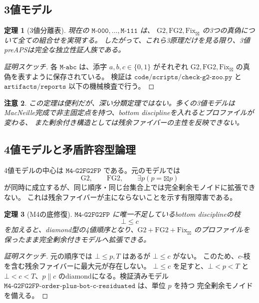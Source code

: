 \documentclass[uplatex,dvipdfmx,a4paper,10pt]{jsarticle}
\newtheorem{theorem}{定理}
\newtheorem{remark}[theorem]{注意}
\newcommand{\Gtwo}{\mathrm{G2}}
\newcommand{\FGtwo}{\mathrm{FG2}}
\newcommand{\Fix}{\mathrm{Fix}}
\newcommand{\bt}{\boxtimes}
\begin{document}
\subsection{3値モデル}

\begin{theorem}[3値分離表]
現在の \(\texttt{M-000},\ldots,\texttt{M-111}\) は、
\(\Gtwo,\FGtwo,\Fix_{\bt}\) の3つの真偽について全ての組合せを実現する。
したがって、これら3原理だけを見る限り、3値preAPSは完全な独立性証人族である。
\end{theorem}

\begin{proof}[証明スケッチ]
各 \(\texttt{M-abc}\) は、添字 \(a,b,c\in\{0,1\}\) がそれぞれ
\(\Gtwo,\FGtwo,\Fix_{\bt}\) の真偽を表すように保存されている。
検証は \(\texttt{code/scripts/check-g2-zoo.py}\) と
\(\texttt{artifacts/reports}\) 以下の機械検査で行う。
\end{proof}

\begin{remark}
この定理は便利だが、深い分類定理ではない。多くの3値モデルは
MacNeille完成で非主固定点を持つ、bottom disciplineを入れるとプロファイルが変わる、
また剰余付き構造としては残余ファイバーの主性を反映できない。
\end{remark}

\subsection{4値モデルと矛盾許容型論理}

4値モデルの中心は \(\texttt{M4-G2FG2FP}\) である。元のモデルでは
\[
\Gtwo,\qquad \FGtwo,\qquad \exists p(p=\bt p)
\]
が同時に成立するが、同じ順序・同じ台集合上では完全剰余モノイドに拡張できない。
これは残余ファイバーが主にならないことを示す有限障害である。

\begin{theorem}[M4の底修復]
\(\texttt{M4-G2FG2FP}\) に唯一不足しているbottom disciplineの枝
\[
\bot\le c
\]
を加えると、diamond型の4値順序となり、\(\Gtwo+\FGtwo+\Fix_{\bt}\)
のプロファイルを保ったまま完全剰余付きモデルへ拡張できる。
\end{theorem}

\begin{proof}[証明スケッチ]
元の順序では \(\bot\le p,T\) はあるが \(\bot\le c\) がない。
このため、\(c\)-枝を含む残余ファイバーに最大元が存在しない。
\(\bot\le c\) を足すと、\(\bot<p<T\) と \(\bot<c<T\)、\(p\parallel c\)
のdiamondになる。検証済みモデル
\(\texttt{M4-G2FG2FP-order-plus-bot-c-residuated}\) は、単位 \(p\) を持つ
完全剰余モノイドを備える。
\end{proof}
\end{document}

